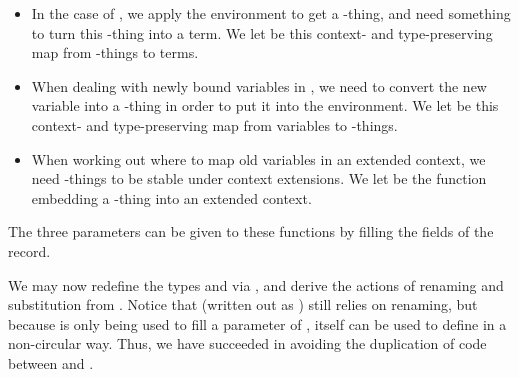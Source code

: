 \begin{itemize}
  \item In the  case of , we
        apply the environment \AgdaBound{$\rho$} to get a -thing,
        and need something to turn this -thing into a term.
        We let  be this context- and type-preserving map from
        -things to terms.
  \item When dealing with newly bound variables in , we
        need to convert the new variable into a -thing in order to
        put it into the environment.
        We let  be this context- and type-preserving map from
        variables to -things.
  \item When working out where to map old variables in an extended context, we
        need -things to be stable under context extensions.
        We let  be the function embedding a -thing
        into an extended context.
\end{itemize}

\trav{}

The three parameters can be given to these functions by filling the fields of
the  record.

\Kit{}

We may now redefine the types  and  via
, and derive the actions of renaming and substitution from
.
Notice that  (written out as
\AgdaSpace{}) still relies on renaming, but
because  is only being used to fill a parameter of
,  itself can be used to define
 in a non-circular way.
Thus, we have succeeded in avoiding the duplication of code between
 and .

\begin{multicols}{3}
  \noindent\RenSub{} \columnbreak

  \noindent\renKit{} \columnbreak

  \noindent\subKit{}
\end{multicols}

